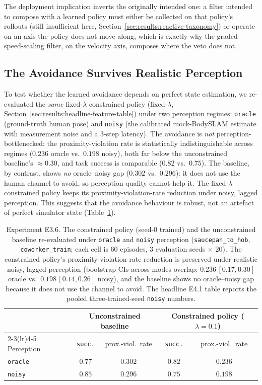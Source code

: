\documentclass[11pt,a4paper]{report}
\newcommand{\bodyslampp}{BodySLAM\nolinebreak[4]\hspace{-.05em}\raisebox{.2ex}{\scriptsize ++}}
\begin{document}
The deployment implication inverts the originally intended one: a
filter intended to compose with a learned policy must either be
collected on that policy's rollouts (still insufficient here,
Section~\ref{sec:results:reactive-taxonomy}) or operate on an axis
the policy does not move along, which is exactly why the graded
speed-scaling filter, on the velocity axis, composes where the veto
does not.

\subsection{The Avoidance Survives Realistic Perception}
\label{sec:results:obs-rl}

To test whether the learned avoidance depends on perfect state
estimation, we re-evaluated the \emph{same} fixed-$\lambda$ constrained policy
(fixed-$\lambda$, Section~\ref{sec:results:headline-feature-table})
under two perception regimes: \texttt{oracle} (ground-truth human
pose) and \texttt{noisy} (the calibrated mock-\bodyslampp{} estimate
with measurement noise and a 3-step latency). The avoidance is
\emph{not} perception-bottlenecked: the proximity-violation rate is
statistically indistinguishable across regimes ($0.236$ oracle vs.\
$0.198$ noisy), both far below the unconstrained baseline's
$\approx$0.30, and task success is comparable ($0.82$ vs.\ $0.75$).
The baseline, by contrast, shows \emph{no} oracle--noisy gap ($0.302$
vs.\ $0.296$): it does not use the human channel to avoid, so
perception quality cannot help it. The fixed-$\lambda$ constrained
policy keeps its proximity-violation-rate reduction under noisy, lagged
perception. This suggests that the avoidance behaviour is robust, not
an artefact of perfect simulator state (Table~\ref{tab:e3.6-obs-rl}).

\begin{table}[htbp]
\centering
\caption{Experiment E3.6. The constrained policy (seed-0 trained)
and the unconstrained baseline re-evaluated under \texttt{oracle} and
\texttt{noisy} perception (\texttt{saucepan\_to\_hob},
\texttt{coworker\_train}; each cell is 60 episodes, 3 evaluation
seeds $\times$ 20). The constrained policy's proximity-violation-rate reduction is preserved
under realistic noisy, lagged perception (bootstrap CIs across modes
overlap: $0.236\,[0.17, 0.30]$ oracle vs.\ $0.198\,[0.14, 0.26]$
noisy), and the baseline shows no oracle--noisy gap because it does
not use the channel to avoid. The headline E4.1 table reports the
pooled three-trained-seed \texttt{noisy} numbers.}
\label{tab:e3.6-obs-rl}
\small
\begin{tabular}{lcccc}
\toprule
 & \multicolumn{2}{c}{Unconstrained baseline} & \multicolumn{2}{c}{Constrained policy ($\lambda{=}0.1$)} \\
\cmidrule(lr){2-3}\cmidrule(lr){4-5}
Perception & \texttt{succ.} & prox.-viol.\ rate & \texttt{succ.} & prox.-viol.\ rate \\
\midrule
\texttt{oracle} & $0.77$ & $0.302$ & $0.82$ & $0.236$ \\
\texttt{noisy}  & $0.85$ & $0.296$ & $0.75$ & $0.198$ \\
\bottomrule
\end{tabular}
\end{table}
\end{document}
